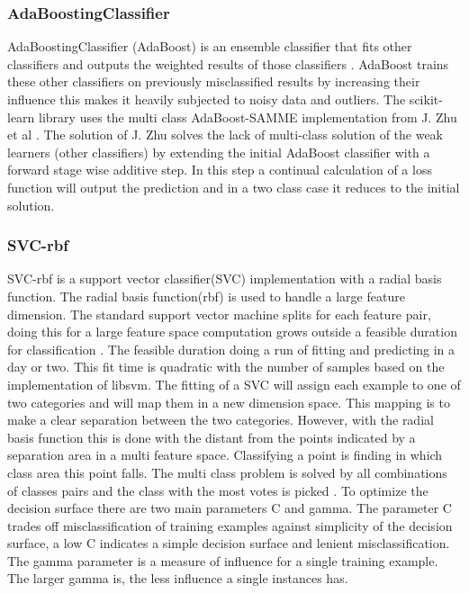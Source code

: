 \documentclass[a4paper,10pt]{article}
\begin{document}
\subsubsection{AdaBoostingClassifier}
AdaBoostingClassifier (AdaBoost) is an ensemble classifier that fits other classifiers and outputs the weighted results of those classifiers \cite{AdaBoost}. AdaBoost trains these other classifiers on previously misclassified results by increasing their influence this makes it heavily subjected to noisy data and outliers. The scikit-learn library uses the multi class AdaBoost-SAMME implementation from J. Zhu et al \cite{MadaB}. The solution of J. Zhu solves the lack of multi-class solution of the weak learners (other classifiers) by extending the initial AdaBoost classifier with a forward stage wise additive step. In this step a continual calculation of a loss function will output the prediction and in a two class case it reduces to the initial solution.

\subsubsection{SVC-rbf}
SVC-rbf is a support vector classifier(SVC) implementation with a radial basis function. The radial basis function(rbf) is used to handle a large feature dimension. The standard support vector machine splits for each feature pair, doing this for a large feature space computation grows outside a feasible duration for classification \cite{SVN}. The feasible duration doing a run of fitting and predicting in a day or two. This fit time is quadratic with the number of samples based on the implementation of libsvm\cite{SVM}. The fitting of a SVC will assign each example to one of two categories and will map them in a new dimension space. This mapping is to make a clear separation between the two categories. However, with the radial basis function this is done with the distant from the points indicated by a separation area in a multi feature space. Classifying a point is finding in which class area this point falls. The multi class problem is solved by  all combinations of classes pairs and the class with the most votes is picked \cite{Multi-pair-coup}. To optimize the decision surface there are two main parameters C and gamma. The parameter C trades off misclassification of training examples against simplicity of the decision surface, a low C indicates a simple decision surface and lenient misclassification. The gamma parameter is a measure of influence for a single training example. The larger gamma is, the less influence a single instances has.
\end{document}
